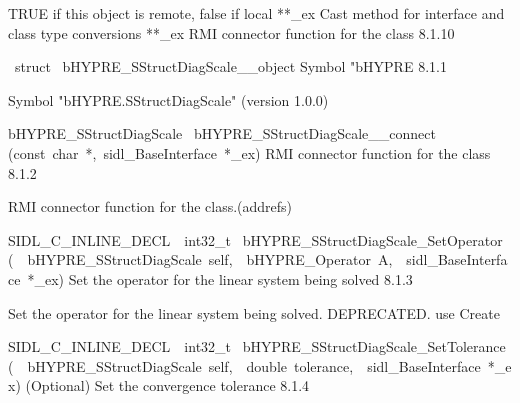 \documentclass{article}
\begin{document}
\begin{cxxentry}
\begin{cxxentry}
\begin{cxxnames}
        {
TRUE if this object is remote, false if local}
        {}
\label{cxx.8.1.35}
        {**\_ex}
        {}
        {
Cast method for interface and class type conversions}
        {}
\label{cxx.8.1.36}
        {**\_ex}
        {}
        {
RMI connector function for the class}
        {8.1.10}
\end{cxxnames}
\begin{cxxvariable}
{\ struct\ }
        {bHYPRE\_SStructDiagScale\_\_object}
        {}
        {
Symbol "bHYPRE}
        {8.1.1}
\begin{cxxdoc}

Symbol "bHYPRE.SStructDiagScale" (version 1.0.0)
\end{cxxdoc}
\end{cxxvariable}
\begin{cxxfunction}
{bHYPRE\_SStructDiagScale\ }
        {bHYPRE\_SStructDiagScale\_\_connect}
        {(const\ char\ *,\ sidl\_BaseInterface\ *\_ex)}
        {
RMI connector function for the class}
        {8.1.2}
\begin{cxxdoc}

RMI connector function for the class.(addrefs)
\end{cxxdoc}
\end{cxxfunction}
\begin{cxxfunction}
{SIDL\_C\_INLINE\_DECL\ \ int32\_t\ }
        {bHYPRE\_SStructDiagScale\_SetOperator}
        {(\ \ bHYPRE\_SStructDiagScale\ self,\ \ bHYPRE\_Operator\ A,\ \ sidl\_BaseInterface\ *\_ex)}
        {
Set the operator for the linear system being solved}
        {8.1.3}
\begin{cxxdoc}

Set the operator for the linear system being solved.
DEPRECATED.  use Create
\end{cxxdoc}
\end{cxxfunction}
\begin{cxxfunction}
{SIDL\_C\_INLINE\_DECL\ \ int32\_t\ }
        {bHYPRE\_SStructDiagScale\_SetTolerance}
        {(\ \ bHYPRE\_SStructDiagScale\ self,\ \ double\ tolerance,\ \ sidl\_BaseInterface\ *\_ex)}
        {
(Optional) Set the convergence tolerance}
        {8.1.4}
\begin{cxxdoc}


\end{cxxdoc}
\end{cxxfunction}
\end{cxxentry}
\end{cxxentry}
\end{document}
